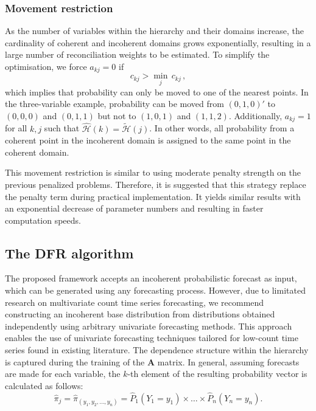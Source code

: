 \documentclass[a4paper,review,12pt,authoryear]{elsarticle}
\theoremstyle{definition}
\begin{document}
    \subsubsection*{\textbf{Movement restriction}}
    As the number of variables within the hierarchy and their domains increase, the cardinality of coherent and incoherent domains grows exponentially, resulting in a large number of reconciliation weights to be estimated.
    To simplify the optimisation, we force $a_{kj}=0$ if
    \[
      c_{kj}>\underset{j}{\min}\,c_{kj}\,,
    \]
    which implies that probability can only be moved to one of the nearest points. In the three-variable example, probability can be moved from $(0,1,0)'$ to $(0,0,0)$ and $(0,1,1)$ but not to $(1,0,1)$ and $(1,1,2)$.
    Additionally, $a_{kj}=1$ for all $k,j$ such that $\hat{\mathcal{H}}(k)=\tilde{\mathcal{H}}(j)$.
    In other words, all probability from a coherent point in the incoherent domain is assigned to the same point in the coherent domain.

    This movement restriction is similar to using moderate penalty strength on the previous penalized problems.
    Therefore, it is suggested that this strategy replace the penalty term during practical implementation. It yields similar results with an exponential decrease of parameter numbers and resulting in faster computation speeds.

    \subsection{The DFR algorithm}
    \label{sec:algorithm1}

    The proposed framework accepts an incoherent probabilistic forecast as input, which can be generated using any forecasting process.
    However, due to limitated research on multivariate count time series forecasting, we recommend constructing an incoherent base distribution from distributions obtained independently using arbitrary univariate forecasting methods.
    This approach enables the use of univariate forecasting techniques tailored for low-count time series found in existing literature.
    The dependence structure within the hierarchy is captured during the training of the $\bm{A}$ matrix.
    In general, assuming forecasts are made for each variable, the $k$-th element of the resulting probability vector is calculated as follows: \[
      \hat{\pi}_j = \hat{\pi}_{(y_1,y_2,\dots,y_n)} = \hat P_{1}(Y_1=y_1)\times\dots\times\hat P_{n}(Y_n=y_n).
    \] 
    
\end{document}
